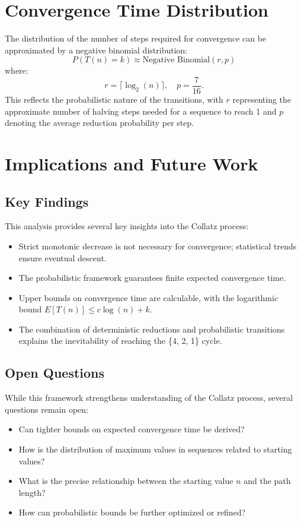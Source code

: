 \section{Convergence Time Distribution}
The distribution of the number of steps required for convergence can be approximated by a negative binomial distribution:
\[
P(T(n) = k) \approx \text{Negative Binomial}(r, p)
\]
where:
\[
r = \lceil \log_2(n) \rceil, \quad p = \frac{7}{16}.
\]
This reflects the probabilistic nature of the transitions, with \( r \) representing the approximate number of halving steps needed for a sequence to reach 1 and \( p \) denoting the average reduction probability per step.

\section{Implications and Future Work}

\subsection{Key Findings}
This analysis provides several key insights into the Collatz process:
\begin{itemize}
    \item Strict monotonic decrease is not necessary for convergence; statistical trends ensure eventual descent.
    \item The probabilistic framework guarantees finite expected convergence time.
    \item Upper bounds on convergence time are calculable, with the logarithmic bound \( E[T(n)] \leq c \log(n) + k \).
    \item The combination of deterministic reductions and probabilistic transitions explains the inevitability of reaching the \{4, 2, 1\} cycle.
\end{itemize}

\subsection{Open Questions}
While this framework strengthens understanding of the Collatz process, several questions remain open:
\begin{itemize}
    \item Can tighter bounds on expected convergence time be derived?
    \item How is the distribution of maximum values in sequences related to starting values?
    \item What is the precise relationship between the starting value \( n \) and the path length?
    \item How can probabilistic bounds be further optimized or refined?
\end{itemize}

